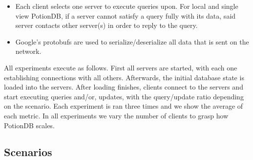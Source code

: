 \documentclass[sigplan,review,anonymous]{acmart}
\begin{document}
\begin{itemize}
	\item Each client selects one server to execute queries upon.
	For local and single view PotionDB, if a server cannot satisfy a query fully with its data, said server contacts other server(s) in order to reply to the query.
	\item Google's protobufs are used to serialize/deserialize all data that is sent on the network.
\end{itemize}

All experiments execute as follows.
First all servers are started, with each one establishing connections with all others. 
Afterwards, the initial database state is loaded into the servers.
After loading finishes, clients connect to the servers and start executing queries and/or, updates, with the query/update ratio depending on the scenario.
Each experiment is ran three times and we show the average of each metric.
In all experiments we vary the number of clients to grasp how PotionDB scales. %



\subsection{Scenarios}
\label{subsec.scenarios}
\end{document}
